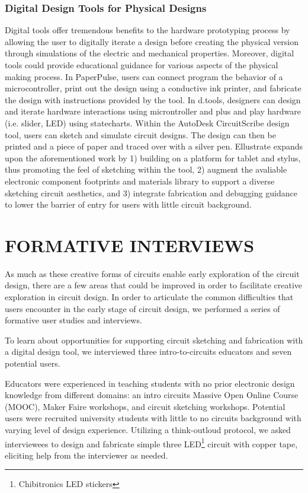 \documentclass{sigchi}
\begin{document}
\subsubsection{Digital Design Tools for Physical Designs}
Digital tools offer tremendous benefits to the hardware prototyping process by allowing the user to digitally iterate a design before creating the physical version through simulations of the electric and mechanical properties. Moreover, digital tools could provide educational guidance for various aspects of the physical making process. In PaperPulse, users can connect program the behavior of a microcontroller, print out the design using a conductive ink printer, and fabricate the design with instructions provided by the tool. In d.tools, designers can design and iterate hardware interactions using microntroller and plus and play hardware (i.e. slider, LED) using statecharts. Within the AutoDesk CircuitScribe design tool, users can sketch and simulate circuit designs. The design can then be printed and a piece of paper and traced over with a silver pen. Ellustrate expands upon the aforementioned work by 1) building on a platform for tablet and stylus, thus promoting the feel of sketching within the tool, 2) augment the avaliable electronic component footprints and materials library to support a diverse sketching circuit aesthetics, and 3) integrate fabrication and debugging guidance to lower the barrier of entry for users with little circuit background.





\section{FORMATIVE INTERVIEWS}
As much as these creative forms of circuits enable early exploration of the circuit design, there are a few areas that could be improved in order to facilitate creative exploration in circuit design. In order to articulate the common difficulties that users encounter in the early stage of circuit design, we performed a series of formative user studies and interviews. 

To learn about opportunities for supporting circuit sketching and fabrication with a digital design tool, we interviewed three intro-to-circuits educators and seven potential users. 

Educators were experienced in teaching students with no prior electronic design knowledge from different domains: an intro circuits Massive Open Online Course (MOOC), Maker Faire workshops, and circuit sketching workshops. 
Potential users were recruited university students with little to no circuits background with varying level of design experience. Utilizing a think-outloud protocol, we asked interviewees to design and fabricate simple three LED\footnote{Chibitronics LED stickers} circuit with copper tape, eliciting help from the interviewer as needed. 
\end{document}
